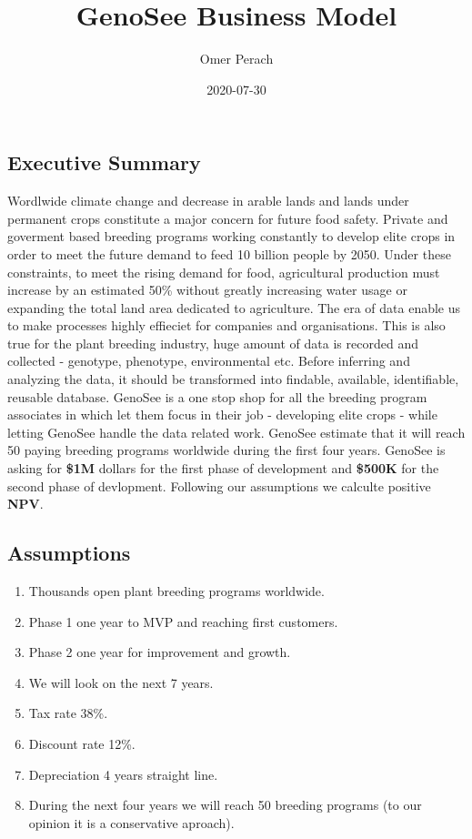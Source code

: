 \documentclass[
]{article}
\title{GenoSee Business Model}
\author{Omer Perach}
\date{2020-07-30}
\providecommand{\tightlist}{%
  \setlength{\itemsep}{0pt}\setlength{\parskip}{0pt}}
\begin{document}
\maketitle

\hypertarget{executive-summary}{%
\subsection{Executive Summary}\label{executive-summary}}

Wordlwide climate change and decrease in arable lands and lands under
permanent crops constitute a major concern for future food safety.
Private and goverment based breeding programs working constantly to
develop elite crops in order to meet the future demand to feed 10
billion people by 2050. Under these constraints, to meet the rising
demand for food, agricultural production must increase by an estimated
50\% without greatly increasing water usage or expanding the total land
area dedicated to agriculture. The era of data enable us to make
processes highly effieciet for companies and organisations. This is also
true for the plant breeding industry, huge amount of data is recorded
and collected - genotype, phenotype, environmental etc. Before inferring
and analyzing the data, it should be transformed into findable,
available, identifiable, reusable database. GenoSee is a one stop shop
for all the breeding program associates in which let them focus in their
job - developing elite crops - while letting GenoSee handle the data
related work. GenoSee estimate that it will reach 50 paying breeding
programs worldwide during the first four years. GenoSee is asking for
\textbf{\$1M} dollars for the first phase of development and
\textbf{\$500K} for the second phase of devlopment. Following our
assumptions we calculte positive \textbf{NPV}.

\hypertarget{assumptions}{%
\subsection{Assumptions}\label{assumptions}}

\begin{enumerate}
\def\labelenumi{\arabic{enumi}.}
\tightlist
\item
  Thousands open plant breeding programs worldwide.
\item
  Phase 1 one year to MVP and reaching first customers.
\item
  Phase 2 one year for improvement and growth.
\item
  We will look on the next 7 years.
\item
  Tax rate 38\%.
\item
  Discount rate 12\%.
\item
  Depreciation 4 years straight line.
\item
  During the next four years we will reach 50 breeding programs (to our
  opinion it is a conservative aproach).
\end{enumerate}
\end{document}
